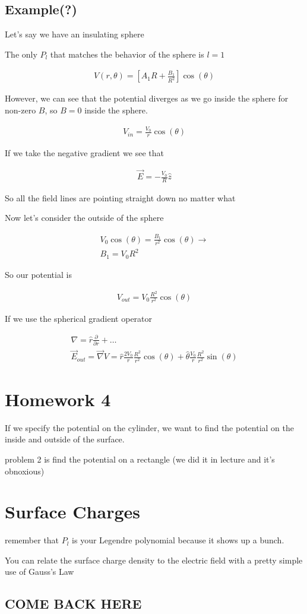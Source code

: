 \documentclass[fleqn]{report}
\newcommand{\del}{\partial}
\newcommand{\equations} [1] {
\begin{gather*}
#1
\end{gather*}
}
\begin{document}
\subsection{Example(?)}
Let's say we have an insulating sphere 

The only $P_l$ that matches the behavior of the sphere is $l = 1$
\equations{
    V(r, \theta)
    =
    \left[
        A_1 R+
        \frac{B_1}{R^2}
    \right]
    \cos(\theta)
}
However, we can see that the potential diverges as we go inside 
the sphere for non-zero $B$, so $B = 0$ inside the sphere. 
\equations{
    V_{in}
    =
    \frac{V_0}{r} \cos(\theta)
}

If we take the negative gradient we see that 
\equations{
    \vec E = -\frac{V_0}{R} \hat z
}

So all the field lines are pointing straight down no matter what 

Now let's consider the outside of the sphere 
\equations{
    V_0 \cos(\theta) 
    =
    \frac{B_1}{r^2} \cos(\theta)
    \rightarrow 
    \\
    B_1 = V_0 R^2
}
So our potential is 
\equations{
    V_{out} = V_0 \frac{R^2}{r^2} \cos(\theta)
}
If we use the spherical gradient operator 
\equations{
    \nabla = 
    \hat r 
    \frac{\del}{\del r} 
    + 
    \ldots 
    \\
    \vec E_{out}
    =
    \vec{\nabla} V 
    = 
    \hat r 
    \frac{2 V_0}{r} 
    \frac{R^2}{r^2}
    \cos(\theta)
    +
    \hat \theta 
    \frac{V_0}{r} 
    \frac{R^2}{r^2}
    \sin(\theta)
}

\section{Homework 4}
If we specify the potential on the cylinder, we want to 
find the potential on the inside and outside of the surface. 

problem 2 is find the potential on a rectangle (we did 
it in lecture and it's obnoxious)


\section{Surface Charges}
remember that $P_l$ is your Legendre polynomial because it shows up a bunch. 

You can relate the surface charge density to the electric field 
with a pretty simple use of Gauss's Law 

\subsection{COME BACK HERE}
\end{document}
